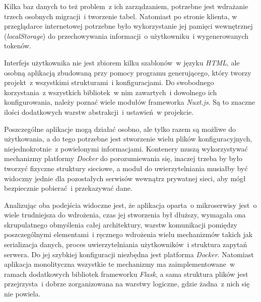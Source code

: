 Kilka baz danych to też problem~z ich zarządzaniem, potrzebne jest wdrażanie trzech osobnych migracji~i tworzenie tabel. Natomiast po stronie klienta, w przeglądarce internetowej potrzebne było wykorzystanie jej pamięci wewnętrznej (\textit{localStorage}) do przechowywania informacji~o użytkowniku~i wygenerowanych tokenów.

Interfejs użytkownika nie jest zbiorem kilku szablonów~w języku \textit{HTML}, ale osobną aplikacją zbudowaną przy pomocy programu generującego, który tworzy projekt~z wszystkimi strukturami~i konfiguracjami. Do swobodnego korzystania~z wszystkich bibliotek~w nim zawartych~i dowolnego ich konfigurowania, należy poznać wiele modułów frameworka \textit{Nuxt.js}. Są to znaczne ilości dodatkowych warstw abstrakcji~i ustawień~w projekcie.

Poszczególne aplikacje mogą działać osobno, ale tylko razem są możliwe do użytkowania, a do tego potrzebne jest stworzenie wielu plików konfiguracyjnych, niejednokrotnie~z powielonymi informacjami. Kontenery muszą wykorzystywać mechanizmy platformy \textit{Docker} do porozumiewania się, inaczej trzeba by było tworzyć fizyczne struktury sieciowe, a moduł do uwierzytelniania musiałby być widoczny jednie dla pozostałych serwisów wewnątrz prywatnej sieci, aby mógł bezpiecznie pobierać~i przekazywać dane.

Analizując oba podejścia widoczne jest, że aplikacja oparta~o mikroserwisy jest~o wiele trudniejsza do wdrożenia, czas jej stworzenia był dłuższy, wymagała ona skrupulatnego obmyślenia całej architektury, warstw komunikacji pomiędzy poszczególnymi elementami~i ręcznego wdrożenia wielu mechanizmów takich jak serializacja danych, proces uwierzytelniania użytkowników~i struktura zapytań serwera. Do jej szybkiej konfiguracji niezbędna jest platforma \textit{Docker}. Natomiast aplikacja monolityczna wszystkie te mechanizmy ma zaimplementowane~w ramach dodatkowych bibliotek frameworku \textit{Flask}, a sama struktura plików jest przejrzysta~i dobrze zorganizowana na warstwy logiczne, gdzie żadna~z nich się nie powiela.